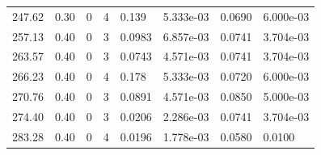 \documentclass[preview]{standalone}
\begin{document}
{{\begin{tabular}{L{1.2cm}C{1.2cm} C{0.3cm}C{0.5cm} C{1.4cm}C{1.4cm} C{1.4cm}C{1.4cm}}
  247.62  &  0.30  & 0     &  4 &  0.139  & 5.333e-03  & 0.0690 &  6.000e-03   \\ 
  257.13  &  0.40  & 0     &  3 &  0.0983  & 6.857e-03  & 0.0741 &  3.704e-03   \\ 
  263.57  &  0.40  & 0     &  3 &  0.0743  & 4.571e-03  & 0.0741 &  3.704e-03   \\ 
  266.23  &  0.40  & 0     &  4 &  0.178  & 5.333e-03  & 0.0720 &  6.000e-03   \\ 
  270.76  &  0.40  & 0     &  3 &  0.0891  & 4.571e-03  & 0.0850 &  5.000e-03   \\ 
  274.40  &  0.40  & 0     &  3 &  0.0206  & 2.286e-03  & 0.0741 &  3.704e-03   \\ 
  283.28  &  0.40  & 0     &  4 &  0.0196  & 1.778e-03  & 0.0580 &  0.0100   \\ 
\hline 
\end{tabular} 

}}
\end{document}
